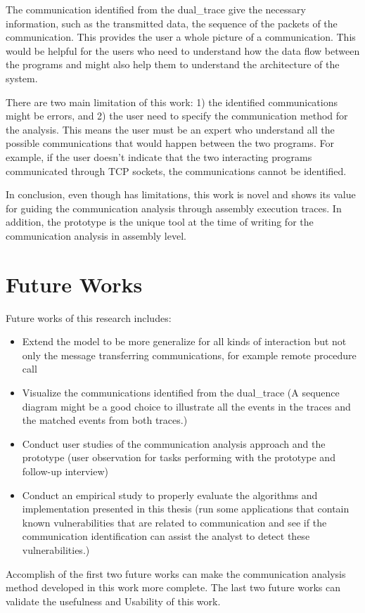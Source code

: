 The communication identified from the dual\_trace give the necessary information, such as the transmitted data, the sequence of the packets of the communication. This provides the user a whole picture of a communication. This would be helpful for the users who need to understand how the data flow between the programs and might also help them to understand the architecture of the system. 

There are two main limitation of this work: 1) the identified communications might be errors, and 2) the user need to specify the communication method for the analysis. This means the user must be an expert who understand all the possible communications that would happen between the two programs. For example, if the user doesn't indicate that the two interacting programs communicated through TCP sockets, the communications cannot be identified. 

In conclusion, even though has limitations, this work is novel and shows its value for guiding the communication analysis through assembly execution traces. In addition, the prototype is the unique tool at the time of writing for the communication analysis in assembly level.

\section{Future Works}

Future works of this research includes:
\begin{itemize}
\item Extend the model to be more generalize for all kinds of interaction but not only the message transferring communications, for example remote procedure call
\item Visualize the communications identified from the dual\_trace (A sequence diagram might be a good choice to illustrate all the events in the traces and the matched events from both traces.) 
\item Conduct user studies of the communication analysis approach and the prototype (user observation for tasks performing with the prototype and follow-up interview)
\item Conduct an empirical study to properly evaluate the algorithms and implementation presented in this thesis (run some applications that contain known vulnerabilities that are related to communication and see if the communication identification can assist the analyst to detect these vulnerabilities.)
\end{itemize}

Accomplish of the first two future works can make the communication analysis method developed in this work more complete. The last two future works can validate the usefulness and Usability of this work.


